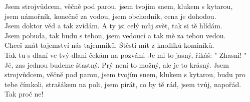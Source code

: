 \ve{}
Jsem strojvůdcem, věčně pod parou,
jsem tvojím snem, klukem s kytarou,\\
jsem námořník, konečně za vodou,
jsem obchodník, cena je dohodou.\\
Jsem doktor věd a tak zvídám.
A ty jsi celý můj svět, tak si tě hlídám.\\
Jsem pobuda, tak budu s tebou,
jsem vedoucí a tak mě za tebou vedou.\\
Chceš znát tajemství nás tajemníků.
Štěstí mít z knoflíků kominíků.\\
Tak tu s dlaní ve tvý dlani čekám na pozvání.
Je mi to jasný, říkáš: " Zhasni! "
\cho{}
Jé, zas jednou budeme šťastný.
Prý není to možný, ale je to krásný.
\ve{}
Jsem strojvůdcem, věčně pod parou,
jsem tvojím snem, klukem s kytarou,
budu pro tebe čímkoli, strašákem na poli,
jsem pirát, co by tě rád,
jsem tvůj, napořád.
\cho{}
\\ Tak proč ne!
